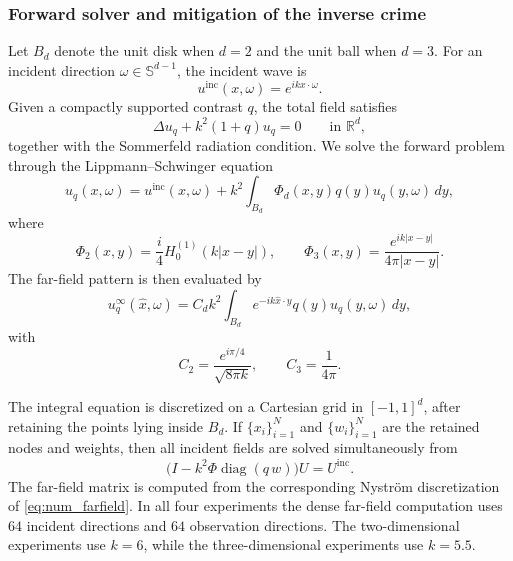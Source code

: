 \documentclass{article}
\numberwithin{equation}{section}
\theoremstyle{plain}
\newcommand{\RR}{\mathbb{R}}
\newcommand{\SSS}{\mathbb{S}}
\begin{document}
\subsubsection{Forward solver and mitigation of the inverse crime}

Let $B_d$ denote the unit disk when $d=2$ and the unit ball when $d=3$.  For an incident direction $\omega\in\SSS^{d-1}$, the incident wave is
\begin{equation*}
	u^{\mathrm{inc}}(x,\omega)=e^{ikx\cdot\omega}.
\end{equation*}
Given a compactly supported contrast $q$, the total field satisfies
\begin{equation*}
	\Delta u_q+k^2(1+q)u_q=0\qquad \text{in }\RR^d,
\end{equation*}
together with the Sommerfeld radiation condition.  We solve the forward problem through the Lippmann--Schwinger equation
\begin{equation}\label{eq:num_ls}
	u_q(x,\omega)=u^{\mathrm{inc}}(x,\omega)
	+k^2\int_{B_d}\Phi_d(x,y)q(y)u_q(y,\omega)\,dy,
\end{equation}
where
\begin{equation*}
	\Phi_2(x,y)=\frac{i}{4}H_0^{(1)}(k|x-y|),
	\qquad
	\Phi_3(x,y)=\frac{e^{ik|x-y|}}{4\pi |x-y|}.
\end{equation*}
The far-field pattern is then evaluated by
\begin{equation}\label{eq:num_farfield}
	u_q^\infty(\widehat x,\omega)
	=C_d k^2\int_{B_d}e^{-ik\widehat x\cdot y}q(y)u_q(y,\omega)\,dy,
\end{equation}
with
\begin{equation*}
	C_2=\frac{e^{i\pi/4}}{\sqrt{8\pi k}},
	\qquad
	C_3=\frac{1}{4\pi}.
\end{equation*}

The integral equation is discretized on a Cartesian grid in $[-1,1]^d$, after retaining the points lying inside $B_d$.  If $\{x_i\}_{i=1}^{N}$ and $\{w_i\}_{i=1}^{N}$ are the retained nodes and weights, then all incident fields are solved simultaneously from
\begin{equation*}
	\bigl(I-k^2\Phi\operatorname{diag}(q\,w)\bigr)U=U^{\mathrm{inc}}.
\end{equation*}
The far-field matrix is computed from the corresponding Nystr\"om discretization of \eqref{eq:num_farfield}.  In all four experiments the dense far-field computation uses $64$ incident directions and $64$ observation directions.  The two-dimensional experiments use $k=6$, while the three-dimensional experiments use $k=5.5$.
\end{document}
